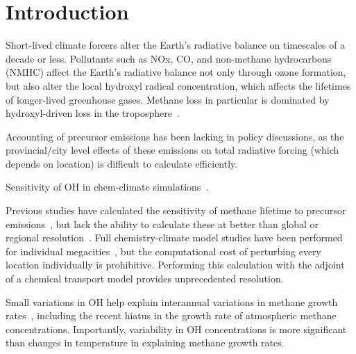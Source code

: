 \section{Introduction}

Short-lived climate forcers alter the Earth's radiative balance on timescales of a decade or less. Pollutants such as NOx, CO, and non-methane hydrocarbons (NMHC) affect the Earth's radiative balance not only through ozone formation, but also alter the local hydroxyl radical concentration, which affects the lifetimes of longer-lived greenhouse gases. Methane loss in particular is dominated by hydroxyl-driven loss in the troposphere~\citep{ref:kirschke2013}.

Accounting of precursor emissions has been lacking in policy discussions, as the provincial/city level effects of these emissions on total radiative forcing (which depends on location) is difficult to calculate efficiently.

Sensitivity of OH in chem-climate simulations~\citep{ref:voulgarakis2013}.

Previous studies have calculated the sensitivity of methane lifetime to precursor emissions~\citep{ref:holmes2013}, but lack the ability to calculate these at better than global or regional resolution~\citep{ref:naik2005,ref:macintosh2015}. Full chemistry-climate model studies have been performed for individual megacities~\citep{ref:dang2015}, but the computational cost of perturbing every location individually is prohibitive. Performing this calculation with the adjoint of a chemical transport model provides unprecedented resolution.

Small variations in OH help explain interannual variations in methane growth rates~\citep{ref:mcnorton2016}, including the recent hiatus in the growth rate of atmospheric methane concentrations. Importantly, variability in OH concentrations is more significant than changes in temperature in explaining methane growth rates.